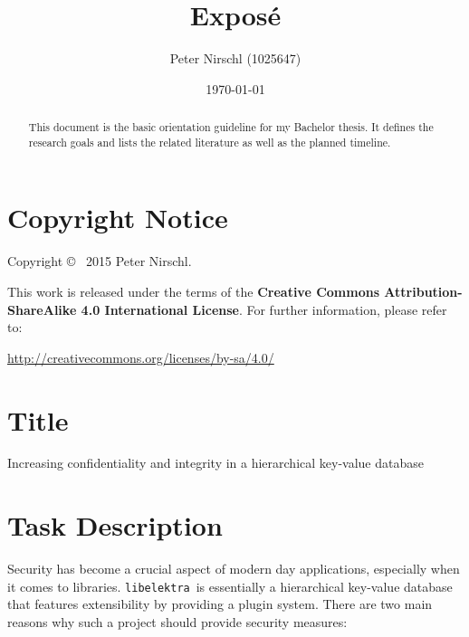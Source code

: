 \documentclass[a4paper,12pt]{article}
\title{Exposé}
\author{Peter Nirschl (1025647)}
\date{\today} %
\newcommand{\libelektra}{\texttt{libelektra}~}
\begin{document}
\maketitle
\begin{abstract}
This document is the basic orientation guideline for my Bachelor thesis.
It defines the research goals and lists the related literature as well as the planned timeline.
\end{abstract}

\vfill

\section*{Copyright Notice}

Copyright \copyright~ 2015 Peter Nirschl.

This work is released under the terms of the \textbf{Creative Commons Attribution-ShareAlike 4.0 International License}.
For further information, please refer to:

\url{http://creativecommons.org/licenses/by-sa/4.0/}

\newpage

\section{Title}

Increasing confidentiality and integrity in a hierarchical key-value database


\section{Task Description}

Security has become a crucial aspect of modern day applications, especially when it comes to libraries.
\libelektra is essentially a hierarchical key-value database that features extensibility by providing a plugin system.
There are two main reasons why such a project should provide security measures:
\end{document}

